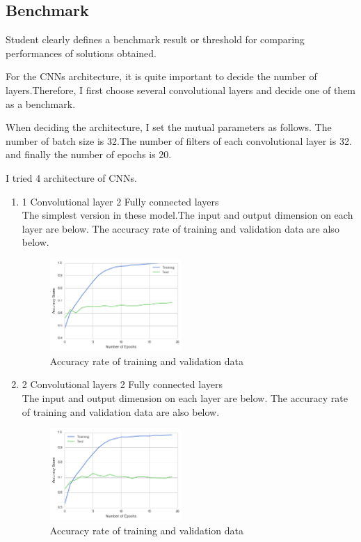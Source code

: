 \subsection{Benchmark}
Student clearly defines a benchmark result or threshold for comparing performances of solutions obtained.

For the CNNs architecture, it is quite important to decide the number of layers.Therefore, I first choose several convolutional layers and decide one of them as a benchmark.

When deciding the architecture, I set the mutual parameters as follows.
The number of batch size is 32.The number of filters of each convolutional layer is 32. and finally the number of epochs is 20.

I tried 4 architecture of CNNs.

\begin{enumerate}
 \item 1 Convolutional layer  2 Fully connected layers \\
 The simplest version in these model.The input and output dimension on each layer are below.
 The accuracy rate of training and validation data are also below.
 
 \begin{figure}[htbp]

	\begin{center}
	\includegraphics[width=5cm]{picture/1layer_cnn.png}
	\caption{Accuracy rate of training and validation data}
	\end{center}
	\label{fig:eight}

\end{figure}
 
 \item 2 Convolutional layers  2 Fully connected layers \\
 The input and output dimension on each layer are below.
 The accuracy rate of training and validation data are also below.
 
 \begin{figure}[htbp]

	\begin{center}
	\includegraphics[width=5cm]{picture/2layer_cnn.png}
	\caption{Accuracy rate of training and validation data}
	\end{center}
	\label{fig:nine}


\end{figure}
\end{enumerate}
